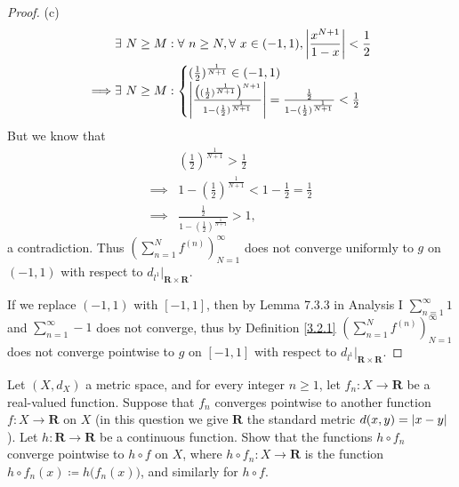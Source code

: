 \begin{proof}{(c)}
\begin{align*}
                 & \exists\ N \geq M : \forall\ n \geq N, \forall\ x \in (-1, 1), \abs*{\frac{x^{N + 1}}{1 - x}} < \frac{1}{2} \\
        \implies & \exists\ N \geq M : \begin{cases}
            (\frac{1}{2})^{\frac{1}{N + 1}} \in (-1, 1) \\
            \abs*{\frac{\big((\frac{1}{2})^{\frac{1}{N + 1}}\big)^{N + 1}}{1 - (\frac{1}{2})^{\frac{1}{N + 1}}}} = \frac{\frac{1}{2}}{1 - (\frac{1}{2})^{\frac{1}{N + 1}}} < \frac{1}{2}
        \end{cases}
    \end{align*}
    But we know that
    \begin{align*}
                 & (\frac{1}{2})^{\frac{1}{N + 1}} > \frac{1}{2}                       \\
        \implies & 1 - (\frac{1}{2})^{\frac{1}{N + 1}} < 1 - \frac{1}{2} = \frac{1}{2} \\
        \implies & \frac{\frac{1}{2}}{1 - (\frac{1}{2})^{\frac{1}{N + 1}}} > 1,
    \end{align*}
    a contradiction.
    Thus \((\sum_{n = 1}^N f^{(n)})_{N = 1}^\infty\) does not converge uniformly to \(g\) on \((-1, 1)\) with respect to \(d_{l^1}|_{\mathbf{R} \times \mathbf{R}}\).

    If we replace \((-1, 1)\) with \([-1, 1]\), then by Lemma 7.3.3 in Analysis I \(\sum_{n = 1}^\infty 1\) and \(\sum_{n = 1}^\infty -1\) does not converge, thus by Definition \ref{3.2.1} \((\sum_{n = 1}^N f^{(n)})_{N = 1}^\infty\) does not converge pointwise to \(g\) on \([-1, 1]\) with respect to \(d_{l^1}|_{\mathbf{R} \times \mathbf{R}}\).
\end{proof}

\begin{exercise}\label{ex 3.2.3}
    Let \((X, d_X)\) a metric space, and for every integer \(n \geq 1\), let \(f_n : X \to \mathbf{R}\) be a real-valued function.
    Suppose that \(f_n\) converges pointwise to another function \(f : X \to \mathbf{R}\) on \(X\)
    (in this question we give \(\mathbf{R}\) the standard metric \(d(x, y) = \abs*{x - y}\)).
    Let \(h : \mathbf{R} \to \mathbf{R}\) be a continuous function.
    Show that the functions \(h \circ f_n\) converge pointwise to \(h \circ f\) on \(X\), where \(h \circ f_n : X \to \mathbf{R}\) is the function \(h \circ f_n(x) \coloneqq h\big(f_n(x)\big)\), and similarly for \(h \circ f\).
\end{exercise}

